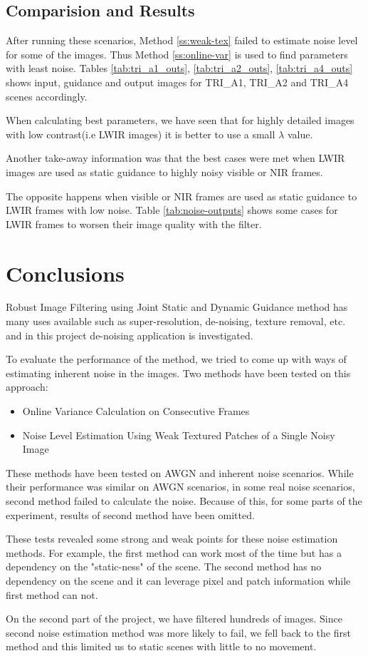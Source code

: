 \documentclass[10pt,twocolumn,letterpaper]{article}
\begin{document}
\subsection{Comparision and Results}	
	After running these scenarios, Method \ref{ss:weak-tex} failed to estimate noise level for some of the images. Thus Method \ref{ss:online-var} is used to find parameters with least noise. Tables \ref{tab:tri_a1_outs}, \ref{tab:tri_a2_outs}, \ref{tab:tri_a4_outs} shows input, guidance and output images for TRI\_A1, TRI\_A2 and TRI\_A4 scenes accordingly.
	
	When calculating best parameters, we have seen that for highly detailed images with low contrast(i.e LWIR images) it is better to use a small \(\lambda\) value.
	
	Another take-away information was that the best cases were met when LWIR images are used as static guidance to highly noisy visible or NIR frames. 
	
	The opposite happens when visible or NIR frames are used as static guidance to LWIR frames with low noise. Table \ref{tab:noise-outputs} shows some cases for LWIR frames to worsen their image quality with the filter.
	
\section{Conclusions}	
	Robust Image Filtering using Joint Static and Dynamic Guidance\cite{ham2015robust} method has many uses available such as super-resolution, de-noising, texture removal, etc. and in this project de-noising application is investigated. 
	
	To evaluate the performance of the method, we tried to come up with ways of estimating inherent noise in the images. Two methods have been tested on this approach:
	\begin{itemize}
		\item Online Variance Calculation on Consecutive Frames
		\item Noise Level Estimation Using Weak Textured Patches of a Single Noisy Image\cite{noise-weak-texture}
	\end{itemize}

	These methods have been tested on AWGN and inherent noise scenarios. While their performance was similar on AWGN scenarios, in some real noise scenarios, second method failed to calculate the noise. Because of this, for some parts of the experiment, results of second method have been omitted.
	
	These tests revealed some strong and weak points for these noise estimation methods. For example, the first method can work most of the time but has a dependency on the "static-ness" of the scene. The second method has no dependency on the scene and it can leverage pixel and patch information while first method can not.
	
	On the second part of the project, we have filtered hundreds of images. Since second noise estimation method was more likely to fail, we fell back to the first method and this limited us to static scenes with little to no movement.
	

	{\small
		
		
	}
	
\end{document}
